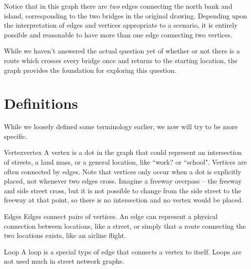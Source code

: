 \begin{example}{}{}
\begin{center}
\begin{tikzpicture}[
  every node/.style={circle, draw, fill=yellow!20, minimum size=6mm, inner sep=1pt},
  >=latex
]
\end{tikzpicture}
\end{center}


Notice that in this graph there are \textit{two} edges connecting the north bank and island, corresponding to the two bridges in the original drawing.  Depending upon the interpretation of edges and vertices appropriate to a scenario, it is entirely possible and reasonable to have more than one edge connecting two vertices.

While we haven't answered the actual question yet of whether or not there is a route which crosses every bridge once and returns to the starting location, the graph provides the foundation for exploring this question.
 \end{example}


\section{Definitions}
While we loosely defined some terminology earlier, we now will try to be more specific.

\begin{definition}{Vertex}{vertex} 
A vertex is a dot in the graph that could represent an intersection of streets, a land mass, or a general location, like ``work? or ``school".  Vertices are often connected by edges.  Note that vertices only occur when a dot is explicitly placed, not whenever two edges cross.  Imagine a freeway overpass -- the freeway and side street cross, but it is not possible to change from the side street to the freeway at that point, so there is no intersection and no vertex would be placed.
\end{definition}

\begin{definition}{Edges}{}
Edges connect pairs of vertices.  An edge can represent a physical connection between locations, like a street, or simply that a route connecting the two locations exists, like an airline flight.
\end{definition}

\begin{definition}{Loop}{}
A loop is a special type of edge that connects a vertex to itself.  Loops are not used much in street network graphs.\\

 \end{definition}


